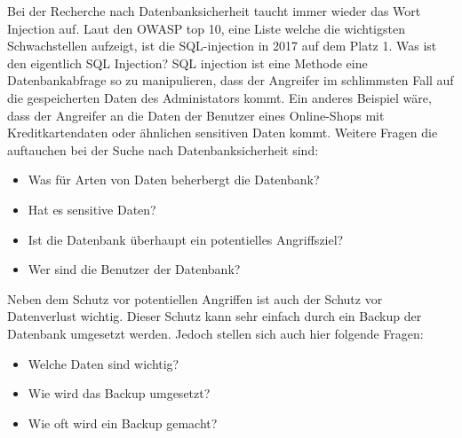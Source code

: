 Bei der Recherche nach Datenbanksicherheit taucht immer wieder das Wort Injection auf. Laut den OWASP top 10, eine Liste welche die wichtigsten Schwachstellen aufzeigt, ist die SQL-injection in 2017 auf dem Platz 1. Was ist den eigentlich SQL Injection? SQL injection ist eine Methode eine Datenbankabfrage so zu manipulieren, dass der Angreifer im schlimmsten Fall auf die gespeicherten Daten des Administators kommt. Ein anderes Beispiel wäre, dass der Angreifer an die Daten der Benutzer eines Online-Shops mit Kreditkartendaten oder ähnlichen sensitiven Daten kommt.
Weitere Fragen die auftauchen bei der Suche nach Datenbanksicherheit sind:
\begin{itemize}
\item Was für Arten von Daten beherbergt die Datenbank?
\item Hat es sensitive Daten?
\item Ist die Datenbank überhaupt ein potentielles Angriffsziel?
\item Wer sind die Benutzer der Datenbank?
\end{itemize}
Neben dem Schutz vor potentiellen Angriffen ist auch der Schutz vor Datenverlust wichtig. Dieser Schutz kann sehr einfach durch ein Backup der Datenbank umgesetzt werden. Jedoch stellen sich auch hier folgende Fragen:
\begin{itemize}
\item Welche Daten sind wichtig?
\item Wie wird das Backup umgesetzt?
\item Wie oft wird ein Backup gemacht?
\end{itemize}


